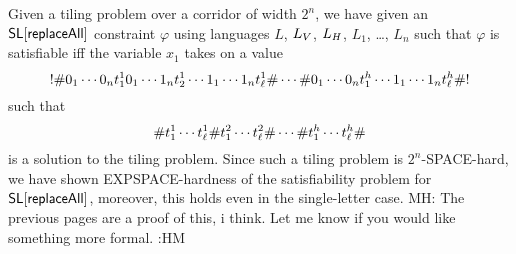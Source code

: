 \documentclass{article}
\newcommand{\mat}[1]{\color{cyan} {MH: #1 :HM} \color{black}}
\begin{document}
Given a tiling problem over a corridor of width $2^n$, we have given an
$\strline[\replaceall]$
constraint $\varphi$ using languages
$L$, $L_\vcons$, $L_\hcons$, $L_1$, \ldots, $L_n$
such that $\varphi$ is satisfiable iff the variable $x_1$ takes on a value
\[
    \resetchar
    \rowdelim \nbit{1}{0} \cdots \nbit{n}{0} \tile^1_1
              \nbit{1}{0} \cdots \nbit{n}{1} \tile^1_2
              \cdots
              \nbit{1}{1} \cdots \nbit{n}{1} \tile^1_\width
    \rowdelim \cdots
    \rowdelim \nbit{1}{0} \cdots \nbit{n}{0} \tile^\height_1
              \cdots
              \nbit{1}{1} \cdots \nbit{n}{1} \tile^\height_\width
    \rowdelim
    \resetchar
\]
such that
\[
    \rowdelim \tile^1_1 \cdots \tile^1_\width
    \rowdelim \tile^2_1 \cdots \tile^2_\width
    \rowdelim \cdots
    \rowdelim \tile^\height_1 \cdots \tile^\height_\width
    \rowdelim
\]
is a solution to the tiling problem.
Since such a tiling problem is $2^n$-SPACE-hard, we have shown EXPSPACE-hardness of
the satisfiability problem for $\strline[\replaceall]$, moreover, this holds even in the single-letter case.
\mat{
    The previous pages are a proof of this, i think.
    Let me know if you would like something more formal.
}
\end{document}
